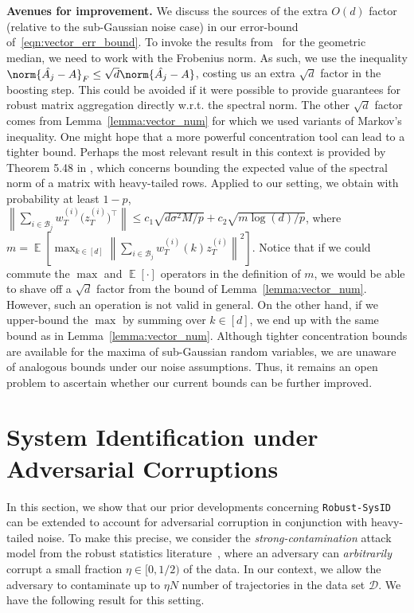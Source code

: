 \documentclass[letterpaper, 11 pt]{article}
\newcommand{\mc}{\mathcal}
\newcommand{\normlr}[1]{\left\lVert#1\right\rVert}
\DeclareMathOperator{\E}{\mathbb{E}}
\begin{document}
\textbf{Avenues for improvement.} We discuss the sources of the extra $O(d)$ factor (relative to the sub-Gaussian noise case) in our error-bound of~\eqref{eqn:vector_err_bound}. To invoke the results from~\cite{minsker2015geometric} for the geometric median, we need to work with the Frobenius norm. As such, we use the inequality $\norm{\hat{A_j} - A}_F \leq \sqrt{d} \norm{\hat{A_j} - A}$, costing us an extra $\sqrt{d}$ factor in the boosting step. This could be avoided if it were possible to provide guarantees for robust matrix aggregation directly w.r.t. the spectral norm. The other $\sqrt{d}$ factor comes from Lemma~\ref{lemma:vector_num} for which we used variants of Markov's inequality. One might hope that a more powerful concentration tool can lead to a tighter bound. Perhaps the most relevant result in this context is provided by Theorem 5.48 in \cite{vershynin2010introduction}, which concerns bounding the expected value of the spectral norm of a matrix with heavy-tailed rows. Applied to our setting, we obtain with probability at least $1 - p$, $\normlr{\sum_{i \in \mc{B}_j} w_T^{(i)}\big(z_T^{(i)}\big)^{\top}} \leq c_1 \sqrt{d \sigma^2 M/p} + c_2\sqrt{m \log(d)/p}$, where $m = \E\left[\max_{k\in[d]} \normlr{\sum_{i \in \mc{B}_j} w_T^{(i)}(k)z_T^{(i)}}^2\right]$. Notice that if we could commute the $\max$ and $\E[\cdot]$ operators in the definition of $m$, we would be able to shave off a $\sqrt{d}$ factor from the bound of Lemma~\ref{lemma:vector_num}. However, such an operation is not valid in general. On the other hand, if we upper-bound the $\max$ by summing over $k \in [d]$, we end up with the same bound as in Lemma~\ref{lemma:vector_num}. Although tighter concentration bounds are available for the maxima of sub-Gaussian random variables, we are unaware of analogous bounds under our noise assumptions. Thus, it remains an open problem to ascertain whether our current bounds can be further improved.
\vspace{-3mm}
\section{System Identification under Adversarial Corruptions}
\label{sec:corruption}
In this section, we show that our prior developments concerning \texttt{Robust-SysID} can be extended to account for adversarial corruption in conjunction with heavy-tailed noise. To make this precise, we consider the \emph{strong-contamination} attack model from the robust statistics literature~\cite{lugosi2021robust}, where an adversary can \emph{arbitrarily} corrupt a small fraction $\eta \in [0, 1/2)$ of the data. In our context, we allow the adversary to contaminate up to $\eta N$ number of trajectories in the data set $\mc{D}$. We have the following result for this setting. 
\end{document}
